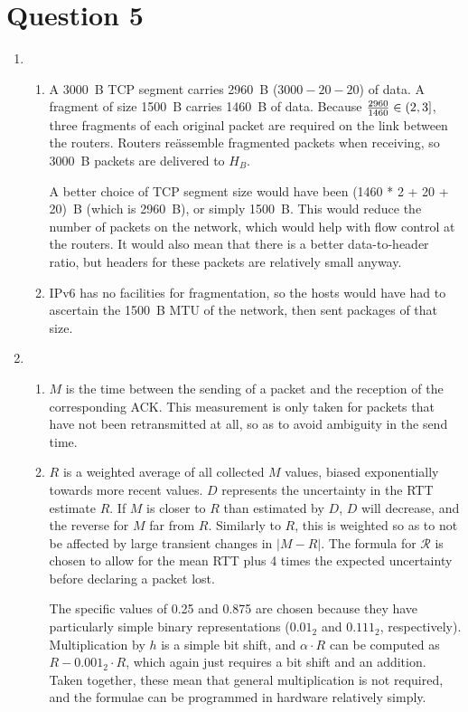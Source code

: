 \documentclass{article}
\begin{document}
\section*{Question 5}
\begin{enumerate}
  \item
    \begin{enumerate}
      \item A \SI{3000}{B} TCP segment carries \SI{2960}{B} ($3000 - 20 - 20$) of data. A fragment of size \SI{1500}{B} carries \SI{1460}{B} of data. Because ${2960 \over 1460} \in (2,3]$, three fragments of each original packet are required on the link between the routers. Routers re\"assemble fragmented packets when receiving, so \SI{3000}{B} packets are delivered to $H_B$.

        A better choice of TCP segment size would have been \SI[parse-numbers=false]{(1460 * 2 + 20 + 20)}{B} (which is \SI{2960}{B}), or simply \SI{1500}{B}. This would reduce the number of packets on the network, which would help with flow control at the routers. It would also mean that there is a better data-to-header ratio, but headers for these packets are relatively small anyway.
      \item IPv6 has no facilities for fragmentation, so the hosts would have had to ascertain the \SI{1500}{B} MTU of the network, then sent packages of that size.
    \end{enumerate}
  \item
    \begin{enumerate}
      \item $M$ is the time between the sending of a packet and the reception of the corresponding ACK. This measurement is only taken for packets that have not been retransmitted at all, so as to avoid ambiguity in the send time.
      \item $R$ is a weighted average of all collected $M$ values, biased exponentially towards more recent values. $D$ represents the uncertainty in the RTT estimate $R$. If $M$ is closer to $R$ than estimated by $D$, $D$ will decrease, and the reverse for $M$ far from $R$. Similarly to $R$, this is weighted so as to not be affected by large transient changes in $\lvert M - R \rvert$. The formula for $\mathcal R$ is chosen to allow for the mean RTT plus 4 times the expected uncertainty before declaring a packet lost.

        The specific values of 0.25 and 0.875 are chosen because they have particularly simple binary representations ($0.01_2$ and $0.111_2$, respectively). Multiplication by $h$ is a simple bit shift, and $\alpha \cdot R$ can be computed as $R - 0.001_2 \cdot R$, which again just requires a bit shift and an addition. Taken together, these mean that general multiplication is not required, and the formulae can be programmed in hardware relatively simply.
    \end{enumerate}
\end{enumerate}
\end{document}
